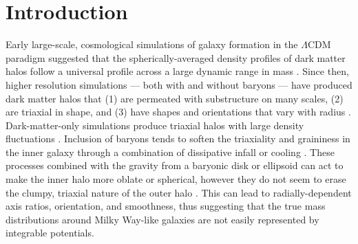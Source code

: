 \documentclass[letterpaper,12pt,preprint]{aastex}
\begin{document}

\section{Introduction}\label{sec:intro}


Early large-scale, cosmological simulations of galaxy formation in the $\Lambda$CDM paradigm suggested that the spherically-averaged density profiles of dark matter halos follow a universal profile across a large dynamic range in mass \citep{navarro96}. Since then, higher resolution simulations --- both with and without baryons --- have produced dark matter halos that (1) are permeated with substructure on many scales, (2) are triaxial in shape, and (3) have shapes and orientations that vary with radius \citep{dubinski91, jing02, kuhlen07, veraciro11}. Dark-matter-only simulations produce triaxial halos \citep{jing02} with large density fluctuations \citep{zemp09}. Inclusion of baryons tends to soften the triaxiality and graininess in the inner galaxy through a combination of dissipative infall \citep{dubinski94} or cooling \citep{bryan13}. These processes combined with the gravity from a baryonic disk or ellipsoid can act to make the inner halo more oblate or spherical, however they do not seem to erase the clumpy, triaxial nature of the outer halo \citep[e.g.,][]{pontzen12}. This can lead to radially-dependent axis ratios, orientation, and smoothness, thus suggesting that the true mass distributions around Milky Way-like galaxies are not easily represented by integrable potentials.
\end{document}
